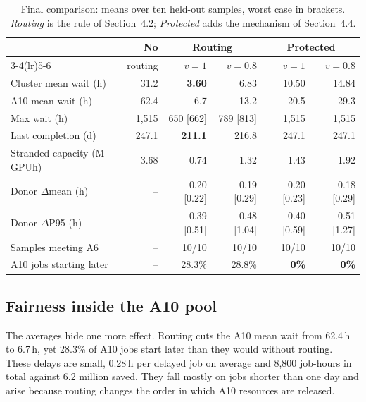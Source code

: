 \documentclass[11pt,a4paper]{article}
\begin{document}
\begin{table}[ht]
\centering\small
\caption{Final comparison: means over ten held-out samples, worst case in brackets. \emph{Routing} is the rule of Section~4.2; \emph{Protected} adds the mechanism of Section~4.4.}\label{tab:final}
\setlength{\tabcolsep}{4pt}
\begin{tabular}{lrrrrr}
\toprule
 & No & \multicolumn{2}{c}{Routing} & \multicolumn{2}{c}{Protected}\\
\cmidrule(lr){3-4}\cmidrule(lr){5-6}
 & routing & $v{=}1$ & $v{=}0.8$ & $v{=}1$ & $v{=}0.8$\\
\midrule
Cluster mean wait (h) & 31.2 & \textbf{3.60} & 6.83 & 10.50 & 14.84\\
A10 mean wait (h) & 62.4 & 6.7 & 13.2 & 20.5 & 29.3\\
Max wait (h) & 1,515 & 650 [662] & 789 [813] & 1,515 & 1,515\\
Last completion (d) & 247.1 & \textbf{211.1} & 216.8 & 247.1 & 247.1\\
Stranded capacity (M GPUh) & 3.68 & 0.74 & 1.32 & 1.43 & 1.92\\
Donor $\Delta$mean (h) & -- & 0.20 [0.22] & 0.19 [0.29] & 0.20 [0.23] & 0.18 [0.29]\\
Donor $\Delta$P95 (h) & -- & 0.39 [0.51] & 0.48 [1.04] & 0.40 [0.59] & 0.51 [1.27]\\
Samples meeting A6 & -- & 10/10 & 10/10 & 10/10 & 10/10\\
A10 jobs starting later & -- & 28.3\% & 28.8\% & \textbf{0\%} & \textbf{0\%}\\
\bottomrule
\end{tabular}
\end{table}

\subsection{Fairness inside the A10 pool}

The averages hide one more effect. Routing cuts the A10 mean wait from 62.4\,h to 6.7\,h, yet 28.3\% of A10 jobs start later than they would without routing. These delays are small, 0.28\,h per delayed job on average and 8,800 job-hours in total against 6.2 million saved. They fall mostly on jobs shorter than one day and arise because routing changes the order in which A10 resources are released.
\end{document}
